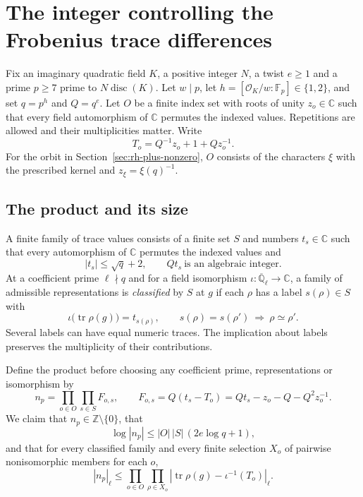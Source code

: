 \section{The integer controlling the Frobenius trace differences}
\label{sec:common-trace-integer}

Fix an imaginary quadratic field \(K\), a positive integer \(N\),
a twist \(e\ge1\) and a prime \(p\ge7\) prime to
\(N\operatorname{disc}(K)\). Let \(w\mid p\), let
\(h=[\mathcal O_K/w:\mathbb F_p]\in\{1,2\}\), and set
\(q=p^h\) and \(Q=q^e\). Let \(O\) be a finite index set with
roots of unity \(z_o\in\mathbb C\) such that every field automorphism
of \(\mathbb C\) permutes the indexed values. Repetitions are
allowed and their multiplicities matter. Write
\[
                T_o=Q^{-1}z_o+1+Qz_o^{-1}.
\]
For the orbit in Section~\ref{sec:rh-plus-nonzero}, \(O\) consists
of the characters \(\xi\) with the prescribed kernel and
\(z_\xi=\xi(q)^{-1}\).

\subsection{The product and its size}

A finite family of trace values consists of a finite set \(S\)
and numbers \(t_s\in\mathbb C\) such that every automorphism of
\(\mathbb C\) permutes the indexed values and
\[
           |t_s|\le\sqrt q+2,\qquad
           Qt_s\ \text{is an algebraic integer}.
\]
At a coefficient prime \(\ell\nmid q\) and for a field
isomorphism \(\iota:\overline{\mathbb Q}_\ell\to\mathbb C\), a
family of admissible representations is \emph{classified} by \(S\)
at \(g\) if each \(\rho\) has a label \(s(\rho)\in S\) with
\[
 \iota\bigl(\operatorname{tr}\rho(g)\bigr)=t_{s(\rho)},\qquad
 s(\rho)=s(\rho')\ \Longrightarrow\ \rho\simeq\rho'.
\]
Several labels can have equal numeric traces. The implication
about labels preserves the multiplicity of their contributions.

Define the product before choosing any coefficient prime,
representations or isomorphism by
\begin{equation}
   n_p=\prod_{o\in O}\prod_{s\in S} F_{o,s},
   \qquad
   F_{o,s}=Q(t_s-T_o)=Qt_s-z_o-Q-Q^2z_o^{-1}.
   \label{eq:common-trace-product}
\end{equation}
We claim that \(n_p\in\mathbb Z\setminus\{0\}\), that
\begin{equation}
  \log|n_p|\le |O|\,|S|\,(2e\log q+1),
  \label{eq:common-trace-log}
\end{equation}
and that for every classified family and every finite selection
\(X_o\) of pairwise nonisomorphic members for each \(o\),
\begin{equation}
 |n_p|_\ell\le
 \prod_{o\in O}\prod_{\rho\in X_o}
 \left|\operatorname{tr}\rho(g)-\iota^{-1}(T_o)\right|_\ell .
 \label{eq:common-trace-subproduct}
\end{equation}

